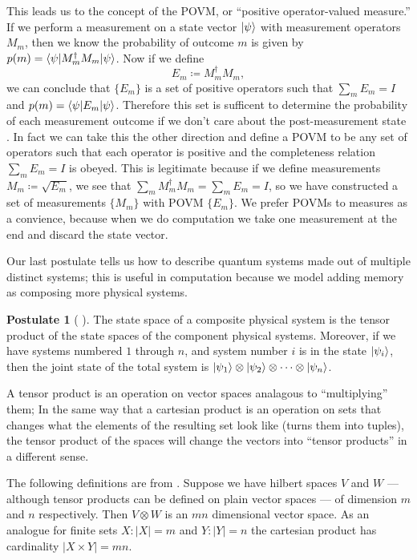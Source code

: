 \documentclass[12pt,twoside]{reedthesis}
\theoremstyle{plain}   %
\theoremstyle{definition}
\newtheorem{post}{Postulate}[section]
\theoremstyle{remark}
\numberwithin{equation}{section}
\begin{document}
  This leads us to the concept of the POVM, or ``positive operator-valued measure.''
  If we perform a measurement on a state vector $\ket{\psi}$ with measurement operators $M_m$, then we know the probability of outcome $m$ is given by $p(m) = \braket{\psi | M_m^\dag M_m | \psi}$.
  Now if we define
  \[ E_m \coloneq M_m^\dag M_m,\]
  we can conclude that $\{E_m\}$ is a set of positive operators such that $\sum_m E_m = I$ and $p(m) = \braket{\psi | E_m | \psi}$.
  Therefore this set is sufficent to determine the probability of each measurement outcome if we don't care about the post-measurement state \cite[2.2.6]{nielsen2010}.
  In fact we can take this the other direction and define a POVM to be any set of operators such that each operator is positive and the
  completeness relation $\sum_m E_m = I$ is obeyed.
  This is legitimate because if we define measurements $M_m \coloneq \sqrt{E_m}$, we see that $\sum_m M_m^\dag M_m = \sum_m E_m = I$,
  so we have constructed a set of measurements $\{M_m\}$ with POVM $\{E_m\}$.
  We prefer POVMs to measures as a convience, because when we do computation we take one measurement at the end and discard the state vector. \par
  Our last postulate tells us how to describe quantum systems made out of multiple distinct systems; this is useful in computation because we model adding memory as
  composing more physical systems.
  \begin{post}[{ \cite[2.2.8]{nielsen2010} }] 
    The state space of a composite physical system is the tensor product of the state spaces of the component physical systems. Moreover,
    if we have systems numbered $1$ through $n$, and system number $i$ is in the state $\ket{\psi_i }$, then the joint state of the total system is $\ket{\psi_1} \otimes \ket{\psi_2} \otimes \cdots \otimes \ket{\psi_n}$.
  \end{post}
  A tensor product is an operation on vector spaces analagous to ``multiplying'' them;
  In the same way that a cartesian product is an operation on sets that changes what the elements of the resulting set look like (turns them into tuples),
  the tensor product of the spaces will change the vectors into ``tensor products'' in a different sense.
  \par
  The following definitions are from \cite[2.1.7]{nielsen2010}.
  Suppose we have hilbert spaces $V$ and $W$ --- although tensor products can be defined on plain vector spaces --- of dimension $m$ and $n$ respectively.
  Then $V \otimes W$ is an $mn$ dimensional vector space.
  As an analogue for finite sets $X: |X| = m$ and $Y: |Y| = n$ the cartesian product has cardinality $|X \times Y| = mn$.
\end{document}
